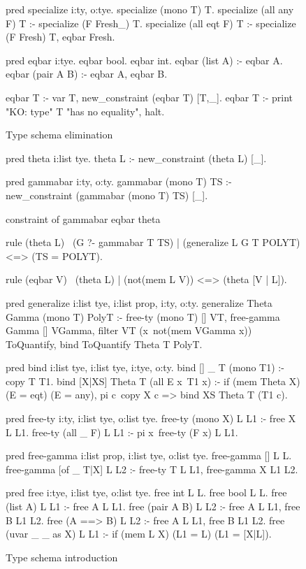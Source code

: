 \documentclass[a4paper, 11pt]{book}
\begin{document}
\begin{figure}
\begin{elpicode}
pred specialize i:ty, o:tye.
specialize (mono T) T.
specialize (all any F) T :- specialize (F Fresh_) T.
specialize (all eqt F) T :- specialize (F Fresh) T, eqbar Fresh.

pred eqbar i:tye.
eqbar bool.
eqbar int.
eqbar (list A) :- eqbar A.
eqbar (pair A B) :- eqbar A, eqbar B.

eqbar T :- var T, new_constraint (eqbar T) [T,_].
eqbar T :- print "KO: type" T "has no equality", halt.
\end{elpicode}
\caption[schema elimination]{Type schema elimination\label{hm:elim}}
\end{figure}

\begin{figure}
\begin{elpicode}
pred theta i:list tye.
theta L :- new_constraint (theta L) [_].

pred gammabar i:ty, o:ty.
gammabar (mono T) TS :- new_constraint (gammabar (mono T) TS) [_].

constraint of gammabar eqbar theta {
  rule (theta L)                    %
        \  (G ?- gammabar T TS)     %
        |  (generalize L G T POLYT) %
      <=> (TS = POLYT).             %

  rule (eqbar V) \ (theta L) | (not(mem L V)) <=> (theta [V | L]).
}

pred generalize i:list tye, i:list prop, i:ty, o:ty.
generalize Theta Gamma (mono T) PolyT :-
  free-ty (mono T) [] VT,
  free-gamma Gamma [] VGamma,
  filter VT (x\ not(mem VGamma x)) ToQuantify,
  bind ToQuantify Theta T PolyT.

pred bind i:list tye, i:list tye, i:tye, o:ty.
bind [] _ T (mono T1) :- copy T T1.
bind [X|XS] Theta T (all E x\ T1 x) :-
  if (mem Theta X) (E = eqt) (E = any),
  pi c\ copy X c => bind XS Theta T (T1 c).

pred free-ty i:ty, i:list tye, o:list tye.
free-ty (mono X) L L1 :- free X L L1.
free-ty (all _ F) L L1 :- pi x\ free-ty (F x) L L1.

pred free-gamma i:list prop, i:list tye, o:list tye.
free-gamma [] L L.
free-gamma [of _ T|X] L L2 :- free-ty T L L1, free-gamma X L1 L2.

pred free i:tye, i:list tye, o:list tye.
free int L L.
free bool L L.
free (list A) L L1 :- free A L L1.
free (pair A B) L L2 :- free A L L1, free B L1 L2.
free (A ==> B) L L2 :- free A L L1, free B L1 L2.
free (uvar _ _ as X) L L1 :- if (mem L X) (L1 = L) (L1 = [X|L]).
\end{elpicode}
\caption[schema introduction]{Type schema introduction\label{hm:intro}}
\end{figure}
\end{document}
